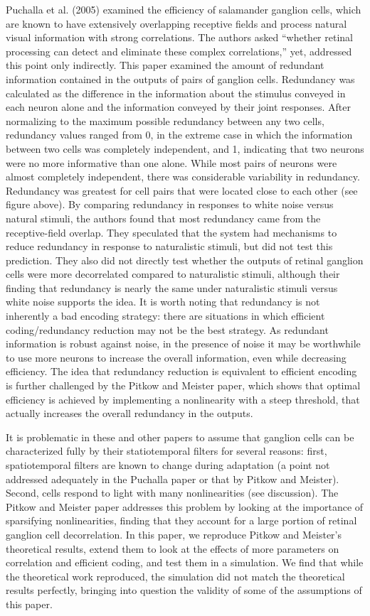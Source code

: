 \documentclass[12pt]{article}
\begin{document}
Puchalla et al. (2005) examined the efficiency of salamander ganglion cells, which are known to have extensively overlapping receptive fields and process natural visual information with strong correlations. The authors asked “whether retinal processing can detect and eliminate these complex correlations,” yet, addressed this point only indirectly. This paper examined the amount of redundant information contained in the outputs of pairs of ganglion cells. Redundancy was calculated as the difference in the information about the stimulus conveyed in each neuron alone and the information conveyed by their joint responses. After normalizing to the maximum possible redundancy between any two cells, redundancy values ranged from 0, in the extreme case in which the information between two cells was completely independent, and 1, indicating that two neurons were no more informative than one alone. While most pairs of neurons were almost completely independent, there was considerable variability in redundancy. Redundancy was greatest for cell pairs that were located close to each other (see figure above). By comparing redundancy in responses to white noise versus natural stimuli, the authors found that most redundancy came from the receptive-field overlap. They speculated that the system had mechanisms to reduce redundancy in response to naturalistic stimuli, but did not test this prediction. They also did not directly test whether the outputs of retinal ganglion cells were more decorrelated compared to naturalistic stimuli, although their finding that redundancy is nearly the same under naturalistic stimuli versus white noise supports the idea. It is worth noting that redundancy is not inherently a bad encoding strategy: there are situations in which efficient coding/redundancy reduction may not be the best strategy. As redundant information is robust against noise, in the presence of noise it may be worthwhile to use more neurons to increase the overall information, even while decreasing efficiency. The idea that redundancy reduction is equivalent to efficient encoding is further challenged by the Pitkow and Meister paper, which shows that optimal efficiency is achieved by implementing a nonlinearity with a steep threshold, that actually increases the overall redundancy in the outputs.

It is problematic in these and other papers to assume that ganglion cells can be characterized fully by their statiotemporal filters for several reasons: first, spatiotemporal filters are known to change during adaptation (a point not addressed adequately in the Puchalla paper or that by Pitkow and Meister). Second, cells respond to light with many nonlinearities (see discussion). The Pitkow and Meister paper addresses this problem by looking at the importance of sparsifying nonlinearities, finding that they account for a large portion of retinal ganglion cell decorrelation. In this paper, we reproduce Pitkow and Meister's theoretical results, extend them to look at the effects of more parameters on correlation and efficient coding, and test them in a simulation. We find that while the theoretical work reproduced, the simulation did not match the theoretical results perfectly, bringing into question the validity of some of the assumptions of this paper.
\end{document}
